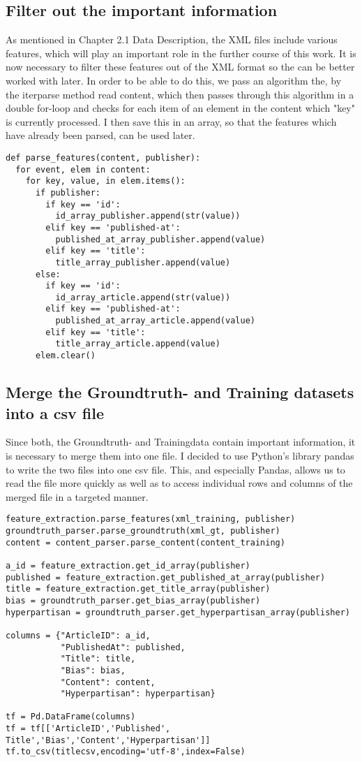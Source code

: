 \documentclass[11pt,titlepage,oneside,openany]{book}
\begin{document}
\subsection{Filter out the important information}
As mentioned in Chapter 2.1 Data Description, the XML files include various features, which will play an important role in the further course of this work. It is now necessary to filter these features out of the XML format so the can be better worked with later. In order to be able to do this, we pass an algorithm the, by the iterparse method read content, which then passes through this algorithm in a double for-loop and checks for each item of an element in the content which "key" is currently processed. I then save this in an array, so that the features which have already been parsed, can be used later. 
\begin{lstlisting}[frame=single]
def parse_features(content, publisher):
  for event, elem in content:
    for key, value, in elem.items():
      if publisher:
        if key == 'id':
          id_array_publisher.append(str(value))
        elif key == 'published-at':
          published_at_array_publisher.append(value)
        elif key == 'title':
          title_array_publisher.append(value)
      else:
        if key == 'id':
          id_array_article.append(str(value))
        elif key == 'published-at':
          published_at_array_article.append(value)
        elif key == 'title':
          title_array_article.append(value)
      elem.clear()
\end{lstlisting}


\subsection{Merge the Groundtruth- and Training datasets into a csv file}
Since both, the Groundtruth- and Trainingdata contain important information, it is necessary to merge them into one file. I decided to use Python's library pandas to write the two files into one csv file. This, and especially Pandas, allows us to read the file more quickly as well as to access individual rows and columns of the merged file in a targeted manner.
\begin{lstlisting}[frame=single]
feature_extraction.parse_features(xml_training, publisher)
groundtruth_parser.parse_groundtruth(xml_gt, publisher)
content = content_parser.parse_content(content_training)

a_id = feature_extraction.get_id_array(publisher)
published = feature_extraction.get_published_at_array(publisher)
title = feature_extraction.get_title_array(publisher)
bias = groundtruth_parser.get_bias_array(publisher)
hyperpartisan = groundtruth_parser.get_hyperpartisan_array(publisher)

columns = {"ArticleID": a_id,
           "PublishedAt": published,
           "Title": title,
           "Bias": bias,
           "Content": content,
           "Hyperpartisan": hyperpartisan}

tf = Pd.DataFrame(columns)
tf = tf[['ArticleID','Published', Title','Bias','Content','Hyperpartisan']]
tf.to_csv(titlecsv,encoding='utf-8',index=False)
\end{lstlisting}
\end{document}
